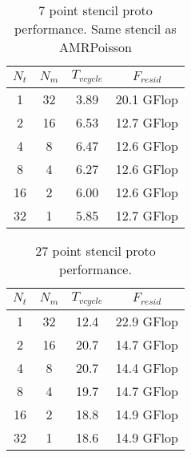 \documentclass[12pt,a4paper]{article}
\begin{document}
\begin{table}[h]
\begin{center}
\begin{tabular}{|c|c||c|c|} \hline
$N_t$ & $N_m$ & $T_{vcycle}$ & $F_{resid}$ \\
\hline 
1  &  32 &    3.89   & 20.1 GFlop\\ 
2  &  16 &    6.53   & 12.7 GFlop\\ 
4  &  8  &    6.47   & 12.6 GFlop\\ 
8  &  4  &    6.27   & 12.6 GFlop\\ 
16 &  2  &    6.00   & 12.6 GFlop\\
32 &  1  &    5.85   & 12.7 GFlop\\
\hline 
\end{tabular}
\end{center}
\caption{7 point stencil proto performance.  Same stencil as AMRPoisson} 
\label{fig::solut2dl0}
\end{table}


\begin{table}[h]
\begin{center}
\begin{tabular}{|c|c||c|c|} \hline
$N_t$ & $N_m$ & $T_{vcycle}$  & $F_{resid}$\\
\hline 
1  &  32 &    12.4 &  22.9 GFlop\\ 
2  &  16 &    20.7 &  14.7 GFlop\\ 
4  &  8  &    20.7 &  14.4 GFlop\\ 
8  &  4  &    19.7 &  14.7 GFlop\\ 
16 &  2  &    18.8 &  14.9 GFlop\\
32 &  1  &    18.6 &  14.9 GFlop\\
\hline 
\end{tabular}
\end{center}
\caption{27 point stencil proto performance.  } 
\label{fig::solut2dl0}
\end{table}
\end{document}
